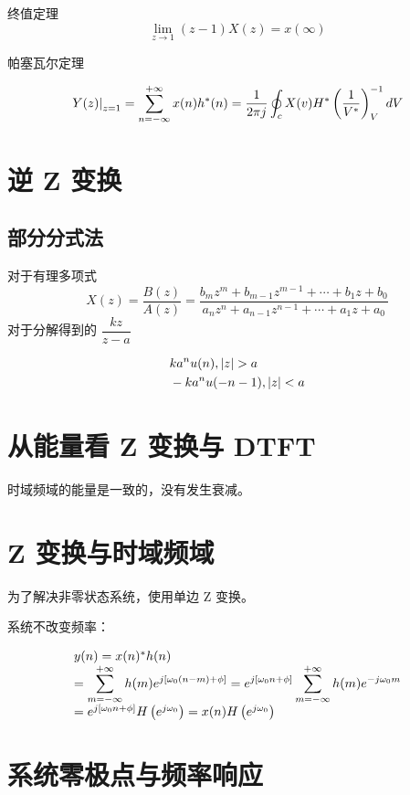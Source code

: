 \documentclass[cn,11pt,chinese,black,simple]{elegantbook}
\begin{document}
终值定理 \[\lim_{z\rightarrow 1}(z-1)X(z) = x(\infty)\]

帕塞瓦尔定理

\[
\left.Y(z)\right|_{z=1}=\displaystyle\sum_{n=-\infty}^{+\infty} x(n) h^{*}(n)=\dfrac{1}{2 \pi j} \oint_{c} X(v) H^{*}\left(\dfrac{1}{V^{*}}\right)_{V}^{-1} d V
\]

\section{逆 Z 变换}

\subsection{部分分式法}

对于有理多项式 \[
    X(z)=\dfrac{B(z)}{A(z)}=\dfrac{b_{m} z^{m}+b_{m-1} z^{m-1}+\cdots+b_{1} z+b_{0}}{a_{n} z^{n}+a_{n-1} z^{n-1}+\cdots+a_{1} z+a_{0}}
\]
对于分解得到的 \(\dfrac{k z}{z-a}\)

\[
\begin{aligned}
    &k a^n u(n), \left| z \right| > a\\
    &-k a^n u(-n-1), \left| z \right| < a\\
\end{aligned}    
\]

\section{从能量看 Z 变换与 DTFT} 

时域频域的能量是一致的，没有发生衰减。


\section{Z 变换与时域频域}

为了解决非零状态系统，使用单边 Z 变换。

系统不改变频率：

\[
\begin{array}{l}
y(n)=x(n)^{*} h(n) \\
=\displaystyle\sum_{m=-\infty}^{+\infty} h(m) e^{j\left[\omega_{0}(n-m)+\phi\right]}=e^{j\left[\omega_{0} n+\phi\right]} \displaystyle\sum_{m=-\infty}^{+\infty} h(m) e^{-j \omega_{0} m} \\
=e^{j\left[\omega_{0} n+\phi\right]} H\left(e^{j \omega_{0}}\right)=x(n) H\left(e^{j \omega_{0}}\right)
\end{array}
\]

\section{系统零极点与频率响应}
\end{document}
